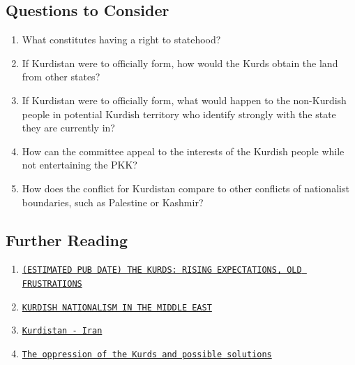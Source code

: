 \documentclass[10pt, letterpaper]{article}
\begin{document}
\subsection{{Questions to Consider}}

\begin{enumerate}
\item
  
  What constitutes having a right to statehood?
  
\item
  
  If Kurdistan were to officially form, how would the Kurds obtain the
  land from other states?
  
\item
  
  If Kurdistan were to officially form, what would happen to the
  non-Kurdish people in potential Kurdish territory who identify
  strongly with the state they are currently in?
  
\item
  
  How can the committee appeal to the interests of the Kurdish people
  while not entertaining the PKK?
  
\item
  
  How does the conflict for Kurdistan compare to other conflicts of
  nationalist boundaries, such as Palestine or Kashmir?
  
\end{enumerate}
\newpage
\subsection{Further Reading}

\begin{enumerate}
\def\labelenumi{\arabic{enumi}.}
\item
  
  \texttt{{\href{https://www.cia.gov/library/readingroom/docs/DOC_0000469140.pdf}{(ESTIMATED
  PUB DATE) THE KURDS: RISING EXPECTATIONS, OLD FRUSTRATIONS}}}
  
\item
  
  \texttt{\href{https://www.cia.gov/library/readingroom/docs/CIA-RDP79-00927A004100020004-3.pdf}{{KURDISH
  NATIONALISM IN THE MIDDLE EAST}}}
  
\item
  
  \texttt{{\href{https://www.globalsecurity.org/military/world/war/kurdistan-iran.htm}{Kurdistan
  - Iran}}}
  
\item
  
  \texttt{\href{https://www.middleeastmonitor.com/20150818-the-oppression-of-the-kurds-and-possible-solutions/}{{The
  oppression of the Kurds and possible solutions}}}
  
\end{enumerate}
\end{document}
